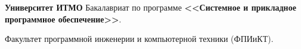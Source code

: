 
\vspace{0.8em}
\begin{scholarship}
     {\textbf {Университет ИТМО} \newline
     Бакалавриат по программе \textbf {<<Системное и прикладное программное обеспечение>>}.

     Факультет программной инженерии и компьютерной техники (ФПИиКТ).}
\end{scholarship}

